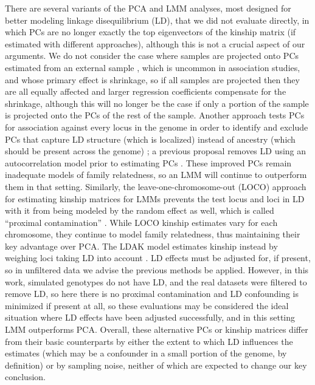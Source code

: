 \documentclass[9pt,lineno]{elife}
\begin{document}
There are several variants of the PCA and LMM analyses, most designed for better modeling linkage disequilibrium (LD), that we did not evaluate directly, in which PCs are no longer exactly the top eigenvectors of the kinship matrix (if estimated with different approaches), although this is not a crucial aspect of our arguments.
We do not consider the case where samples are projected onto PCs estimated from an external sample \citep{prive_efficient_2020}, which is uncommon in association studies, and whose primary effect is shrinkage, so if all samples are projected then they are all equally affected and larger regression coefficients compensate for the shrinkage, although this will no longer be the case if only a portion of the sample is projected onto the PCs of the rest of the sample.
Another approach tests PCs for association against every locus in the genome in order to identify and exclude PCs that capture LD structure (which is localized) instead of ancestry (which should be present across the genome) \citep{prive_efficient_2020}; a previous proposal removes LD using an autocorrelation model prior to estimating PCs \citep{patterson_population_2006}.
These improved PCs remain inadequate models of family relatedness, so an LMM will continue to outperform them in that setting.
Similarly, the leave-one-chromosome-out (LOCO) approach for estimating kinship matrices for LMMs prevents the test locus and loci in LD with it from being modeled by the random effect as well, which is called ``proximal contamination'' \citep{lippert_fast_2011, yang_advantages_2014}.
While LOCO kinship estimates vary for each chromosome, they continue to model family relatedness, thus maintaining their key advantage over PCA.
The LDAK model estimates kinship instead by weighing loci taking LD into account \citep{speed_improved_2012}.
LD effects must be adjusted for, if present, so in unfiltered data we advise the previous methods be applied.
However, in this work, simulated genotypes do not have LD, and the real datasets were filtered to remove LD, so here there is no proximal contamination and LD confounding is minimized if present at all, so these evaluations may be considered the ideal situation where LD effects have been adjusted successfully, and in this setting LMM outperforms PCA.
Overall, these alternative PCs or kinship matrices differ from their basic counterparts by either the extent to which LD influences the estimates (which may be a confounder in a small portion of the genome, by definition) or by sampling noise, neither of which are expected to change our key conclusion.
\end{document}

